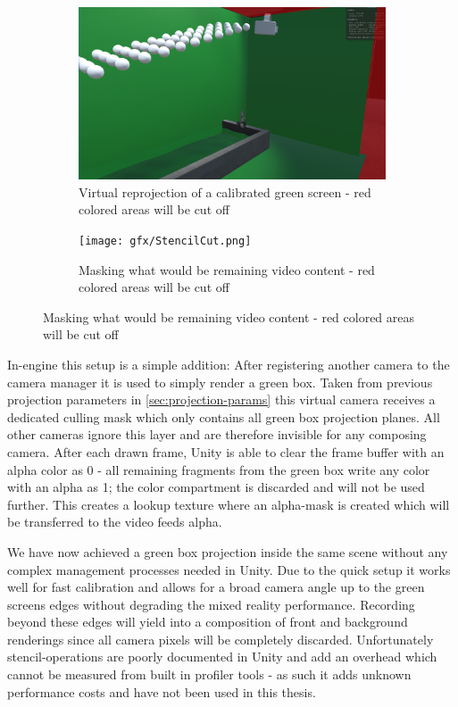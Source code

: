\begin{figure}[htbp]
	\caption{Virtual projection and photo of VR actor - note: in-engine 
	screenshot and photos were taken shortly apart and therefore don't fit 
	exactly}
	\label{fig:stencil:projection}
	\begin{subfigure}[t]{.45\textwidth}
		\centering
		\includegraphics[width=\textwidth]{gfx/StencilProjection.png}
		\caption{Virtual reprojection of a calibrated green screen - red 
		colored areas will be cut off}
	\end{subfigure}
	\begin{subfigure}[t]{.45\textwidth}
		\centering
		\texttt{[image: gfx/StencilCut.png]}
		\caption{Masking what would be remaining video content - red colored 
		areas will be cut off}
	\end{subfigure}
\end{figure}

In-engine this setup is a simple addition: After registering another camera to 
the camera manager it is used to simply render a green box. Taken from previous 
projection parameters in \ref{sec:projection-params} this virtual camera 
receives a dedicated culling mask which only contains all green box projection 
planes. All other cameras ignore this layer and are therefore invisible for any 
composing camera. After each drawn frame, Unity is able to clear the frame 
buffer with an alpha color as 0 - all remaining fragments from the green box 
write any color with an alpha as 1; the color compartment is discarded and will 
not be used further. This creates a lookup texture where an alpha-mask is 
created which will be transferred to the video feeds alpha.

We have now achieved a green box projection inside the same scene without any 
complex management processes needed in Unity. Due to the quick setup it works 
well for fast calibration and allows for a broad camera angle up to the green 
screens edges without degrading the mixed reality performance. Recording beyond 
these edges will yield into a composition of front and background renderings 
since all camera pixels will be completely discarded.
\newline
Unfortunately stencil-operations are poorly documented in Unity and add an 
overhead which cannot be measured from built in profiler tools - as such it 
adds unknown performance costs and have not been used in this thesis.